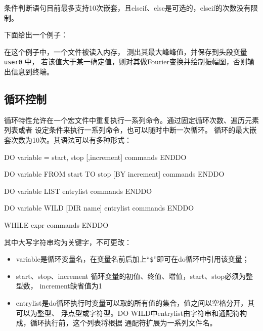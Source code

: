 条件判断语句目前最多支持10次嵌套，且elseif、else是可选的，elseif的次数没有限制。

下面给出一个例子：
在这个例子中，一个文件被读入内存， 测出其最大峰峰值，并保存到头段变量 \texttt{user0} 中，
若该值大于某一确定值，则对其做Fourier变换并绘制振幅图，否则输出信息到终端。

\subsection{循环控制}
循环特性允许在一个宏文件中重复执行一系列命令。通过固定循环次数、遍历元素列表或者
设定条件来执行一系列命令，也可以随时中断一次循环。
循环的最大嵌套次数为10次。其语法可以有多种形式：
\begin{SACCode}
DO variable = start, stop [,increment]
    commands
ENDDO
\end{SACCode}

\begin{SACCode}
DO variable FROM start TO stop [BY increment]
    commands
ENDDO
\end{SACCode}

\begin{SACCode}
DO variable LIST entrylist
    commands
ENDDO
\end{SACCode}

\begin{SACCode}
DO variable WILD [DIR name] entrylist
    commands
ENDDO
\end{SACCode}

\begin{SACCode}
WHILE expr
    commands
ENDDO
\end{SACCode}
其中大写字符串均为关键字，不可更改：
\begin{itemize}
\item variable是循环变量名，在变量名前后加上``\verb|$|''即可在do循环中引用该变量；
\item start、stop、increment 循环变量的初值、终值、增值，start、stop必须为整型数，
    increment缺省值为1
\item entrylist是do循环执行时变量可以取的所有值的集合，值之间以空格分开，其可以为整型、
  浮点型或字符型。DO WILD中entrylist由字符串和通配符构成，循环执行前，这个列表将根据
  通配符扩展为一系列文件名。
\end{itemize}


